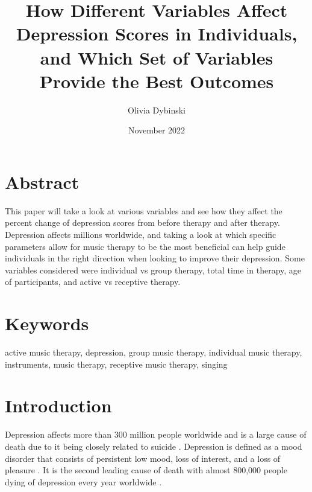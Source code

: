 \documentclass[12pt]{article}
\title{How Different Variables Affect Depression Scores in Individuals, and Which Set of Variables Provide the Best Outcomes}
\author{Olivia Dybinski\\}
\date{November 2022}
\begin{document}
 \maketitle


 \section{Abstract} 
 \label{sec:abstract}

 This paper will take a look at various variables and see how they affect the percent change of depression scores from before therapy and after therapy. Depression affects millions worldwide, and taking a look at which specific parameters allow for music therapy to be the most beneficial can help guide individuals in the right direction when looking to improve their depression. Some variables considered were individual vs group therapy, total time in therapy, age of participants, and active vs receptive therapy.

 \section{Keywords}
 \label{sec:keywords}

 active music therapy, depression, group music therapy, individual music therapy, instruments, music therapy, receptive music therapy, singing

 \section{Introduction} 
 \label{sec:introduction}

 Depression affects more than 300 million people worldwide and is a large cause of death due to it being closely related to suicide \citet{PLOS}. Depression is defined as a mood disorder that consists of persistent low mood, loss of interest, and a loss of pleasure \citet{Cochrane}. It is the second leading cause of death with almost 800,000 people dying of depression every year worldwide \citet{PLOS}. 
\end{document}
